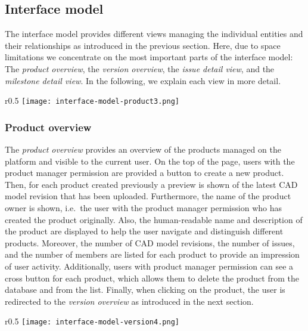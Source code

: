 \subsection{Interface model}

The interface model provides different views managing the individual entities and their relationships as introduced in the previous section.
Here, due to space limitations we concentrate on the most important parts of the interface model: The \textit{product overview}, the \textit{version overview}, the \textit{issue detail view}, and the \textit{milestone detail view}.
In the following, we explain each view in more detail.

\begin{wrapfigure}{r}{0.5\textwidth}
    \centering
    \texttt{[image: interface-model-product3.png]}
    \label{fig:screenshot-product}
\end{wrapfigure}

\subsubsection{Product overview}

The \textit{product overview} provides an overview of the products managed on the platform and visible to the current user.
On the top of the page, users with the product manager permission are provided a button to create a new product.
Then, for each product created previously a preview is shown of the latest CAD model revision that has been uploaded.
Furthermore, the name of the product owner is shown, i.e.\ the user with the product manager permission who has created the product originally.
Also, the human-readable name and description of the product are displayed to help the user navigate and distinguish different products.
Moreover, the number of CAD model revisions, the number of issues, and the number of members are listed for each product to provide an impression of user activity.
Additionally, users with product manager permission can see a cross button for each product, which allows them to delete the product from the database and from the list.
Finally, when clicking on the product, the user is redirected to the \textit{version overview} as introduced in the next section.

\begin{wrapfigure}{r}{0.5\textwidth}
    \centering
    \texttt{[image: interface-model-version4.png]}
    \label{fig:screenshot-version}
\end{wrapfigure}

